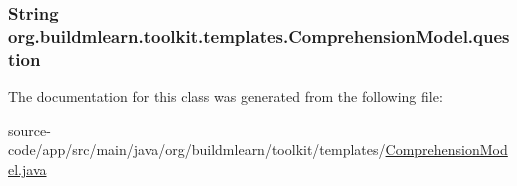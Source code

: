 \subsubsection[{\texorpdfstring{question}{question}}]{\setlength{\rightskip}{0pt plus 5cm}String org.\+buildmlearn.\+toolkit.\+templates.\+Comprehension\+Model.\+question\hspace{0.3cm}{\ttfamily [private]}}\hypertarget{classorg_1_1buildmlearn_1_1toolkit_1_1templates_1_1ComprehensionModel_a51f7dca2d72fbd6cbbd8bcaea754d2e2}{}\label{classorg_1_1buildmlearn_1_1toolkit_1_1templates_1_1ComprehensionModel_a51f7dca2d72fbd6cbbd8bcaea754d2e2}


The documentation for this class was generated from the following file\+:\begin{DoxyCompactItemize}
\item 
source-\/code/app/src/main/java/org/buildmlearn/toolkit/templates/\hyperlink{ComprehensionModel_8java}{Comprehension\+Model.\+java}\end{DoxyCompactItemize}
